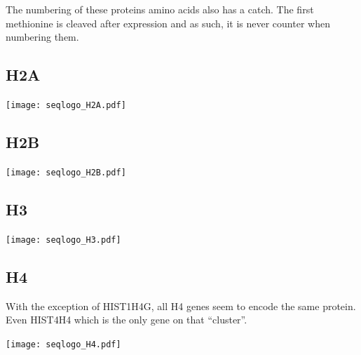 \documentclass[10pt,a4paper,twocolumn,article]{memoir}
\begin{document}
    The numbering of these proteins amino acids also has a catch. The first methionine is cleaved after expression and as such, it is
    never counter when numbering them.

    \subsection{H2A}
      \begin{TableAndFigure*}
        \label{tab:H2A-consensus}
        

        \texttt{[image: seqlogo\_H2A.pdf]}
        \label{fig:H2A-weblogo}
      \end{TableAndFigure*}


    \subsection{H2B}
      \begin{TableAndFigure*}
        \label{tab:H2B-consensus}
        

        \texttt{[image: seqlogo\_H2B.pdf]}
        \label{fig:H2B-weblogo}
      \end{TableAndFigure*}

    \subsection{H3}
      \begin{TableAndFigure*}
        \label{tab:H3-consensus}
        

        \texttt{[image: seqlogo\_H3.pdf]}
        \label{fig:H3-weblogo}
      \end{TableAndFigure*}

    \subsection{H4}
      With the exception of HIST1H4G, all H4 genes seem to encode the same protein. Even HIST4H4 which is the
      only gene on that ``cluster''.
      \begin{TableAndFigure*}
        \label{tab:H4-consensus}
        

        \texttt{[image: seqlogo\_H4.pdf]}
        \label{fig:H4-weblogo}
      \end{TableAndFigure*}
\end{document}
